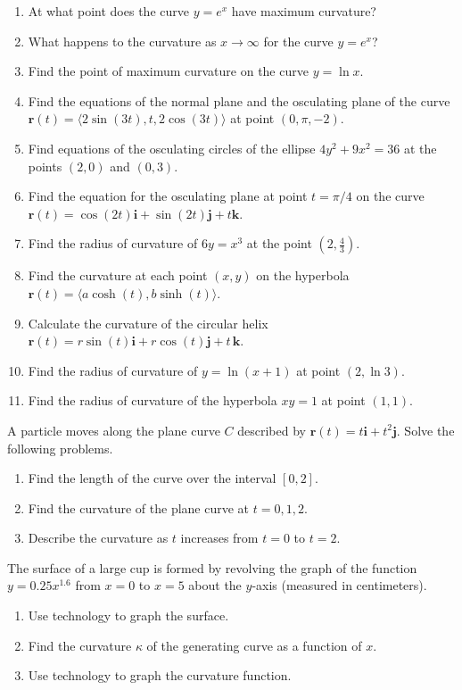 \documentclass{exercises}
\begin{document}
\begin{enumerate}[start=1]
\item At what point does the curve $y=e^{x}$ have maximum curvature?
\item What happens to the curvature as $x\to \infty$ for the curve $y=e^{x}$?
\item Find the point of maximum curvature on the curve $y=\ln x$.
\item Find the equations of the normal plane and the osculating plane of the curve $\mathbf{r}(t)=\langle2\sin(3t),t,2\cos(3t)\rangle$ at point $(0,\pi,-2)$.
\item Find equations of the osculating circles of the ellipse $4y^{2}+9x^{2}=36$ at the points $(2,0)$ and $(0,3)$.
\item Find the equation for the osculating plane at point $t=\pi/4$ on the curve $\mathbf{r}(t)=\cos(2t)\mathbf{i}+\sin(2t)\mathbf{j}+t\mathbf{k}$.
\item Find the radius of curvature of $6y=x^{3}$ at the point $(2,\frac{4}{3})$.
\item Find the curvature at each point $(x,y)$ on the hyperbola $\mathbf{r}(t)=\langle a\cosh(t),b\sinh(t)\rangle$.
\item Calculate the curvature of the circular helix $\mathbf{r}(t)=r\sin(t)\mathbf{i}+r\cos(t)\mathbf{j}+t\,\mathbf{k}$.
\item Find the radius of curvature of $y=\ln(x+1)$ at point $(2,\ln 3)$.
\item Find the radius of curvature of the hyperbola $xy=1$ at point $(1,1)$.
\end{enumerate}

A particle moves along the plane curve $C$ described by $\mathbf{r}(t)=t\mathbf{i}+t^{2}\mathbf{j}$. Solve the following problems.

\begin{enumerate}[resume]
\item Find the length of the curve over the interval $[0,2]$.
\item Find the curvature of the plane curve at $t=0,1,2$.
\item Describe the curvature as $t$ increases from $t=0$ to $t=2$.
\end{enumerate}

The surface of a large cup is formed by revolving the graph of the function $y=0.25x^{1.6}$ from $x=0$ to $x=5$ about the $y$-axis (measured in centimeters).

\begin{enumerate}[resume]
\item \techrequired Use technology to graph the surface.
\item Find the curvature $\kappa$ of the generating curve as a function of $x$.
\item \techrequired Use technology to graph the curvature function.
\end{enumerate}
\end{document}
